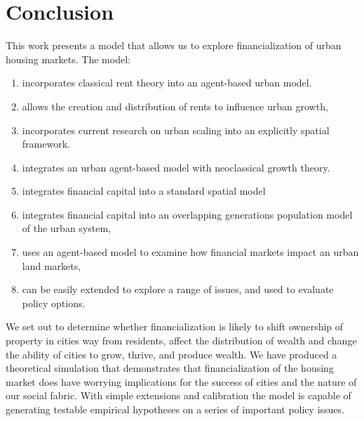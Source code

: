 \chapter{Conclusion} \label{chapter-conclusions}



This work presents a model that allows us to explore financialization of urban housing markets. The model: 
\begin{enumerate}
    \item  incorporates \gls{classical rent theory} into an \gls{agent-based} urban model. 
    
    \item allows the creation and distribution of rents to influence urban growth, 
    
    \item incorporates current research on \gls{urban scaling} into an explicitly spatial framework.
    
    \item integrates an urban \gls{agent-based model} with {neoclassical growth theory}. 
    
    \item integrates \gls{financial capital} into a standard spatial model 
    
    \item integrates financial capital into an \gls{overlapping generations} population model of the urban system, 
    
    \item uses an agent-based model to examine how financial markets impact an urban \glspl{land market}, 
    \item can be easily extended to explore a range of issues, and used to evaluate policy options. 
\end{enumerate}



We set out to determine whether financialization is likely to  shift ownership of property in cities way from residents, affect  the distribution of wealth and  change the ability of cities to grow, thrive, and produce wealth. {\color{red}We have produced  a theoretical simulation that demonstrates that financialization of the housing market does have worrying implications for the success of cities and the nature of our social fabric. With simple extensions and calibration the model is capable of generating testable empirical hypotheses on a series of important policy issues.}  %

